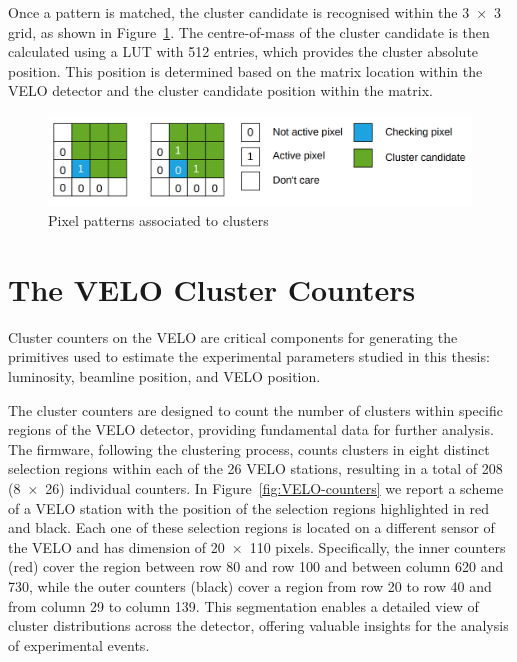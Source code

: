Once a pattern is matched, the cluster candidate is recognised within the 3~×~3 grid, as shown in Figure~\ref{fig:cluster_recognition}. The centre-of-mass of the cluster candidate is then calculated using a LUT with 512 entries, which provides the cluster absolute position. This position is determined based on the matrix location within the VELO detector and the cluster candidate position within the matrix.

\begin{figure}[h]
    \centering
    \includegraphics[width=\textwidth]{figures/cluster_recognition.png}
    \caption{Pixel patterns associated to clusters}
    \label{fig:cluster_recognition}
\end{figure}

\section{The VELO Cluster Counters}\label{sec:velo_counters}
Cluster counters on the VELO are critical components for generating the primitives used to estimate the experimental parameters studied in this thesis: luminosity, beamline position, and VELO position. 

The cluster counters are designed to count the number of clusters within specific regions of the VELO detector, providing fundamental data for further analysis. The firmware, following the clustering process, counts clusters in eight distinct selection regions within each of the 26 VELO stations, resulting in a total of 208 (8~×~26) individual counters. In Figure~\ref{fig:VELO-counters} we report a scheme of a VELO station with the position of the selection regions highlighted in red and black. Each one of these selection regions is located on a different sensor of the VELO and has dimension of 20~×~110 pixels. Specifically, the inner counters (red) cover the region between row 80 and row 100 and between column 620 and 730, while the outer counters (black) cover a region from row 20 to row 40 and from column 29 to column 139. This segmentation enables a detailed view of cluster distributions across the detector, offering valuable insights for the analysis of experimental events.%


